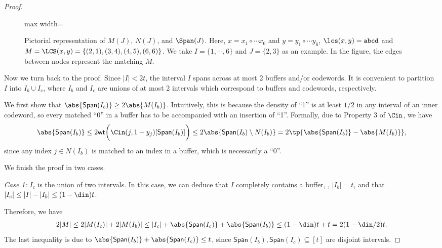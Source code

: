 \begin{proof}
\begin{figure}[tp]
\begin{center}
\begin{adjustbox}{max width={\linewidth}}
\begin{tikzpicture}[>={stealth}, square/.style={regular polygon,regular polygon sides=4}]
\end{tikzpicture}
\end{adjustbox}
\end{center}
\caption{Pictorial representation of $M(J)$, $N(J)$, and $\Span(J)$. Here, $x = x_1 \circ \cdots x_6$ and $y = y_1 \circ \cdots y_6$, $\lcs(x,y) = \texttt{abcd}$ and $M = \LCS(x,y) = \{ (2,1), (3,4), (4,5), (6,6) \}$. We take $I = \{1,\cdots, 6\}$ and $J = \{2,3\}$ as an example. In the figure, the edges between nodes represent the matching $M$.}\label{fig:wrldc-notation}
\end{figure}

Now we turn back to the proof. 
Since $|I|< 2t$, the interval $I$ spans across at most 2 buffers and/or codewords. 
It is convenient to partition $I$ into $I_b \cup I_c$, where $I_b$ and $I_c$ are unions of at most 2 intervals which correspond to buffers and codewords, respectively.  

We first show that $\abs{\textsf{Span}(I_b)} \ge 2\abs{M(I_b)}$. Intuitively, this is because the density of ``1'' is at least $1/2$ in any interval of an inner codeword, so every matched ``0'' in a buffer has to be accompanied with an insertion of ``1''. Formally, due to Property 3 of $\Cin$, we have
\begin{align*}
	\abs{\textsf{Span}(I_b)} \le 2\textsf{wt}\bigg(\Cin(j, 1-y_j)[\textsf{Span}(I_b)]\bigg) \le 2\abs{\textsf{Span}(I_b) \setminus N(I_b)} = 2\tp{\abs{\textsf{Span}(I_b)} - \abs{M(I_b)}},
\end{align*}
since any index $j \in N(I_b)$ is matched to an index in a buffer, which is necessarily a ``0''. 

We finish the proof in two cases.

\textit{Case 1:} $I_c$ is the union of two intervals. 
In this case, we can deduce that $I$ completely contains a buffer, \ie, $|I_b|=t$, and that $|I_c|\le |I|-|I_b|\le (1-\din)t$. 

Therefore, we have
\begin{align*}
	2|M| \le 2|M(I_c)| + 2|M(I_b)| \le |I_c| + \abs{\textsf{Span}(I_c)} + \abs{\textsf{Span}(I_b)} \le (1-\din)t + t = 2(1-\din/2)t.
\end{align*}
The last inequality is due to $\abs{\textsf{Span}(I_b)} + \abs{\textsf{Span}(I_c)} \le t$, since $\textsf{Span}(I_b), \textsf{Span}(I_c) \subseteq [t]$ are disjoint intervals.


\end{proof}
